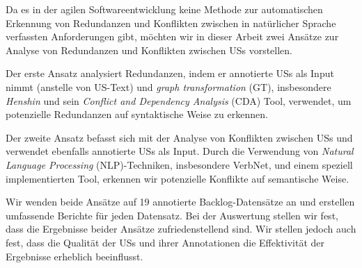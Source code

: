 Da es in der agilen Softwareentwicklung keine Methode zur automatischen Erkennung von Redundanzen und Konflikten zwischen in natürlicher Sprache verfassten Anforderungen gibt, möchten wir in dieser Arbeit zwei Ansätze zur Analyse von Redundanzen und Konflikten zwischen USs vorstellen.

Der erste Ansatz analysiert Redundanzen, indem er annotierte USs als Input nimmt (anstelle von US-Text) und \textit{graph transformation} (GT), insbesondere \textit{Henshin} und sein \textit{Conflict and Dependency Analysis} (CDA) Tool, verwendet, um potenzielle Redundanzen auf syntaktische Weise zu erkennen.

Der zweite Ansatz befasst sich mit der Analyse von Konflikten zwischen USs und verwendet ebenfalls annotierte USs als Input. Durch die Verwendung von \textit{Natural Language Processing} (NLP)-Techniken, insbesondere VerbNet, und einem speziell implementierten Tool, erkennen wir potenzielle Konflikte auf semantische Weise.

Wir wenden beide Ansätze auf 19 annotierte Backlog-Datensätze an und erstellen umfassende Berichte für jeden Datensatz. Bei der Auswertung stellen wir fest, dass die Ergebnisse beider Ansätze zufriedenstellend sind. Wir stellen jedoch auch fest, dass die Qualität der USs und ihrer Annotationen die Effektivität der Ergebnisse erheblich beeinflusst.